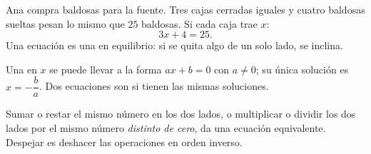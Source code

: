 \documentclass[11pt,a4paper]{article}
\begin{document}
\begin{minipage}[c]{0.56\linewidth}
Ana compra baldosas para la fuente. Tres cajas cerradas iguales y cuatro baldosas sueltas pesan lo mismo que
$25$ baldosas. Si cada caja trae $x$:
\[ 3x+4=25 . \]
Una ecuación es una  en equilibrio: si se quita algo de un solo lado, se inclina.
\end{minipage}\hfill
\begin{minipage}[c]{0.4\linewidth}\centering
{}
\end{minipage}

\begin{definicion}
Una  en $x$ se puede llevar a la forma $ax+b=0$ con $a\neq0$; su única solución es
$x=-\dfrac{b}{a}$. Dos ecuaciones son  si tienen las mismas soluciones.
\end{definicion}
\begin{propiedad}
Sumar o restar el mismo número en los dos lados, o multiplicar o dividir los dos lados por el mismo número
\emph{distinto de cero}, da una ecuación equivalente. Despejar es deshacer las operaciones en orden inverso.
\end{propiedad}
\end{document}
